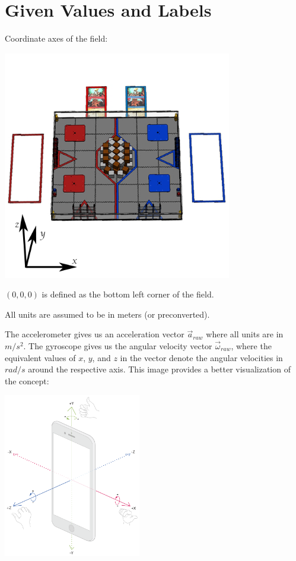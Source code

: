 \documentclass{article}
\begin{document}
\section{Given Values and Labels}
\begin{center}
    Coordinate axes of the field:

    \includegraphics[width=10cm]{field_coordinate}
    
    $(0, 0, 0)$ is defined as the bottom left corner of the field.
    
    All units are assumed to be in meters (or preconverted).
\end{center}
\clearpage

The accelerometer gives us an acceleration vector $\vec{a}_{raw}$
where all units are in $m/s^2$. The gyroscope gives us the angular velocity vector
$\vec{\omega}_{raw}$, where the equivalent values of $x$, $y$, and $z$ in the vector denote the angular velocities in $rad/s$ around the respective axis. This image provides a better visualization of the concept:

\begin{center}
    \includegraphics[width=6cm]{gyroscope_axes}
\end{center}
\end{document}

